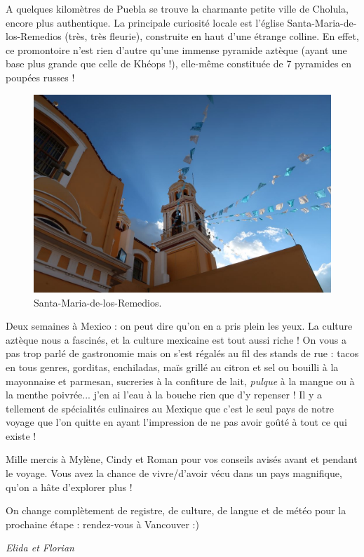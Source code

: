 A quelques kilomètres de Puebla se trouve la charmante petite ville de
Cholula, encore plus authentique. La principale curiosité locale est
l'église Santa-Maria-de-los-Remedios (très, très fleurie), construite en
haut d'une étrange colline. En effet, ce promontoire n'est rien d'autre
qu'une immense pyramide aztèque (ayant une base plus grande que celle de
Khéops !), elle-même constituée de 7 pyramides en poupées russes !

\begin{figure}
\centering
\includegraphics{images/20180930_cholula.JPG}
\caption{Santa-Maria-de-los-Remedios.}
\end{figure}

Deux semaines à Mexico : on peut dire qu'on en a pris plein les yeux. La
culture aztèque nous a fascinés, et la culture mexicaine est tout aussi
riche ! On vous a pas trop parlé de gastronomie mais on s'est régalés au
fil des stands de rue : tacos en tous genres, gorditas, enchiladas, maïs
grillé au citron et sel ou bouilli à la mayonnaise et parmesan,
sucreries à la confiture de lait, \emph{pulque} à la mangue ou à la
menthe poivrée... j'en ai l'eau à la bouche rien que d'y repenser ! Il y
a tellement de spécialités culinaires au Mexique que c'est le seul pays
de notre voyage que l'on quitte en ayant l'impression de ne pas avoir
goûté à tout ce qui existe !

Mille mercis à Mylène, Cindy et Roman pour vos conseils avisés avant et
pendant le voyage. Vous avez la chance de vivre/d'avoir vécu dans un
pays magnifique, qu'on a hâte d'explorer plus !

On change complètement de registre, de culture, de langue et de météo
pour la prochaine étape : rendez-vous à Vancouver :)

\emph{Elida et Florian}

